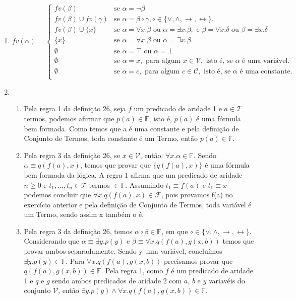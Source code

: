 	\begin{enumerate}
		\item 
		\[
		fv(\alpha)=\left\{
           \begin{array}{ll}
             fv(\beta) & \text{se }\alpha = \neg \beta\\
             fv(\beta)\cup fv(\gamma) & \text{se }\alpha = \beta\circ\gamma,
             \circ\in\{\lor,\land,\to,\leftrightarrow\}.\\
             fv(\beta) \cup \{x\} & \text{se }\alpha = \forall x.\beta \text{ ou } \alpha = \exists x.\beta,\text{ e } \beta = \forall x.\delta \text{ ou } \beta = \exists x.\delta\\
             \{x\} & \text{se }\alpha = \forall x.\beta \text{ ou } \alpha = \exists x.\beta.\\
             \emptyset &  \text{se }\alpha = \top \text{ ou }\alpha = \bot\\
             \emptyset & \text{se } \alpha = x, \text{ para algum }x \in \mathcal{V},\text{ isto é, se }\alpha\text{ é uma variável}. \\
             \emptyset & \text{se } \alpha = c, \text{ para algum } c\in\mathcal{C}, \text{ isto é, se }\alpha\text{ é uma constante}.\\
           \end{array}
        \right .
		\]
		\item
		\begin{enumerate}
			\item
			 Pela regra 1 da defini\c{c}\~ao 26, seja $f$ um predicado de aridade 1 e $a\in\mathcal{T}$ termos, podemos afirmar que $p(a)\in\mathbb{F}$, isto é, $p(a)$ é uma fórmula bem formada. Como temos que a \'e uma constante e pela defini\c{c}\~ao de Conjunto de Termos, toda constante \'e um Termo, então $p(a)\in\mathbb{F}$.
			\item
			Pela regra 3 da defini\c{c}\~ao 26, se $x \in \mathcal{V}$, então: $\forall x. \alpha \in \mathbb{F}$. Sendo $\alpha \equiv q(f(a),x)$, temos que provar que $\{q(f(a), x)\}$ \'e uma f\'ormula bem formada da l\'ogica. A regra 1 afirma que um predicado de aridade $n \geq 0$ e $t_1,...,t_n\in\mathcal{T}$ termos $\in \mathbb{F}$. Assumindo $t_1 \equiv f(a)$ e $t_1 \equiv x$ podemos concluir que $\forall x. q(f(a),x)\in \mathcal{F}$, pois provamos f(a) no exerc\'icio anterior e pela defini\c{c}\~ao de Conjunto de Termos, toda vari\'avel \'e um Termo, sendo assim x também o \'e.
			\item
			Pela regra 3 da defini\c{c}\~ao 26, temos $\alpha \circ \beta \in \mathbb{F}$, em que $\circ\in\{\lor,\land,\to,\leftrightarrow\}$. Considerando que $\alpha \equiv \exists y. p(y)$ e $ \beta \equiv \forall x. q(f(a),g(x,b))$ temos que provar ambos separadamente. Sendo y uma vari\'avel, conclu\'imos $\exists y. p(y) \in \mathbb{F}$. Para $\forall x. q(f(a),g(x,b))$ precisamos provar que $q(f(a),g(x,b)) \in \mathbb{F}$. Pela regra 1, como $f$ \'e um predicado de aridade 1 e $q$ e $g$ sendo ambos predicados de aridade 2 com $a$, $b$ e $y$ variav\'eis do conjunto $\mathcal{V}$, ent\~ao $\exists y. p(y) \land \forall x. q(f(a),g(x,b)) \in \mathbb{F} $.

\end{enumerate}
\end{enumerate}
